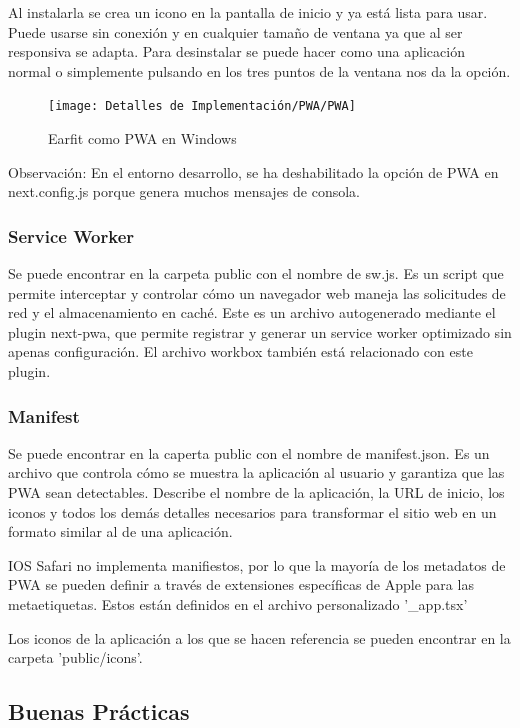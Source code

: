 \documentclass[12pt,twoside,titlepage]{report}
\begin{document}
Al instalarla se crea un icono en la pantalla de inicio y ya está lista para usar. Puede usarse sin conexión y en cualquier tamaño de ventana ya que al ser responsiva se adapta. Para desinstalar se puede hacer como una aplicación normal o simplemente pulsando en los tres puntos de la ventana nos da la opción.

\begin{figure}[H]
    \centering
    \texttt{[image: Detalles de Implementación/PWA/PWA]}
    \label{fig:PWA}
    \caption{Earfit como PWA en Windows}
\end{figure}

Observación: En el entorno desarrollo, se ha deshabilitado la opción de PWA en next.config.js porque genera muchos mensajes de consola.

\subsubsection{Service Worker}
Se puede encontrar en la carpeta public con el nombre de sw.js. Es un script que permite interceptar y controlar cómo un navegador web maneja las solicitudes de red y el almacenamiento en caché. Este es un archivo autogenerado mediante el plugin next-pwa, que permite registrar y generar un service worker optimizado sin apenas configuración. El archivo workbox también está relacionado con este plugin.

\subsubsection{Manifest}
Se puede encontrar en la caperta public con el nombre de manifest.json. Es un archivo que controla cómo se muestra la aplicación al usuario y garantiza que las PWA sean detectables. Describe el nombre de la aplicación, la URL de inicio, los iconos y todos los demás detalles necesarios para transformar el sitio web en un formato similar al de una aplicación. 

IOS Safari no implementa manifiestos, por lo que la mayoría de los metadatos de PWA se pueden definir a través de extensiones específicas de Apple para las metaetiquetas. Estos están definidos en el archivo personalizado '\_app.tsx'

Los iconos de la aplicación a los que se hacen referencia se pueden encontrar en la carpeta 'public/icons'.


\subsection{Buenas Prácticas}
\end{document}
